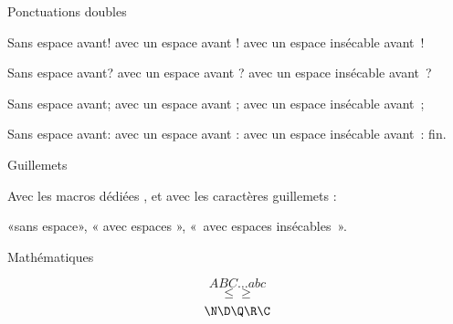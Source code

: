 \beginsection Ponctuations doubles

Sans espace avant! avec un espace avant ! avec un espace insécable avant !
\par
Sans espace avant? avec un espace avant ? avec un espace insécable avant ?
\par
Sans espace avant; avec un espace avant ; avec un espace insécable avant ;
\par
Sans espace avant: avec un espace avant : avec un espace insécable avant :
fin.

\beginsection Guillemets

\og Avec les macros dédiées \fg, et avec les caractères guillemets :\par
«sans espace», « avec espaces », « avec espaces insécables ».

\beginsection Mathématiques

$$ A B C \dots a b c $$
$$ \le \ge $$
$$ \N\D\Q\R\C $$


\bye
